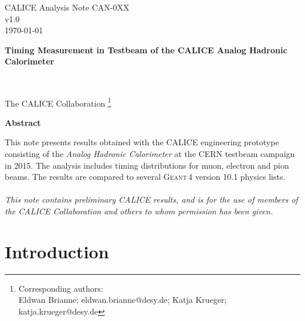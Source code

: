 \documentclass[twoside,a4paper,11pt]{article}
\newcommand\geant{\textsc{Geant\,4}\xspace}
\begin{document}
\begin{titlepage}
\begin{flushright}
CALICE Analysis Note CAN-0XX\\
v1.0\\
\today\\
\end{flushright}

\begin{center}
\vspace*{\fill}
\begin{LARGE} \textbf{Timing Measurement in Testbeam of the CALICE Analog Hadronic Calorimeter} \end{LARGE} \\ [10ex]
\begin{Large} The CALICE Collaboration \footnote{Corresponding authors: \\ Eldwan Brianne; eldwan.brianne@desy.de; Katja Krueger; katja.krueger@desy.de}\\ [10ex]
\end{Large}

\begin{large}
\textbf{Abstract} \\
\end{large}
\end{center}
This note presents results obtained with the CALICE engineering prototype consisting of the \emph{Analog Hadronic Calorimeter} at the CERN testbeam campaign in 2015. The analysis includes timing distributions for muon, electron and pion beams. The results are compared to several \geant version 10.1 physics lists.\\
\\

\textit{
This note contains preliminary CALICE results, and is for the use of members of the CALICE Collaboration and others to whom permission has been given.}

\end{titlepage}

\clearpage
\tableofcontents
\newpage
\section{Introduction}
\end{document}
